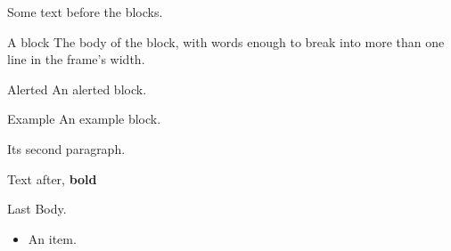 \documentclass{beamer}
\begin{document}
\begin{frame}
Some text before the blocks.
\begin{block}{A block}
The body of the block, with words enough to break into more than one line in the frame's width.
\end{block}
\begin{alertblock}{Alerted}
An alerted block.
\end{alertblock}
\begin{exampleblock}{Example}
An example block.

Its second paragraph.
\end{exampleblock}
Text after, \textbf{bold} \begin{block}{Last}
Body.
\end{block}
\begin{itemize}
\item An item.
\end{itemize}
\end{frame}
\end{document}
